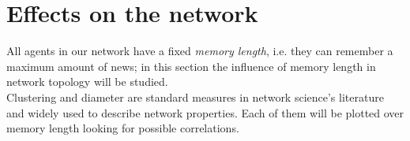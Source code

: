 \section{Effects on the network}
All agents in our network have a fixed \textit{memory length}, i.e.
they can remember a maximum amount of news;
in this section the influence of memory length in network topology
will be studied.\\
Clustering and diameter are standard measures in network science's
literature and widely used to describe network properties.
Each of them will be plotted over memory length looking for
possible correlations.


